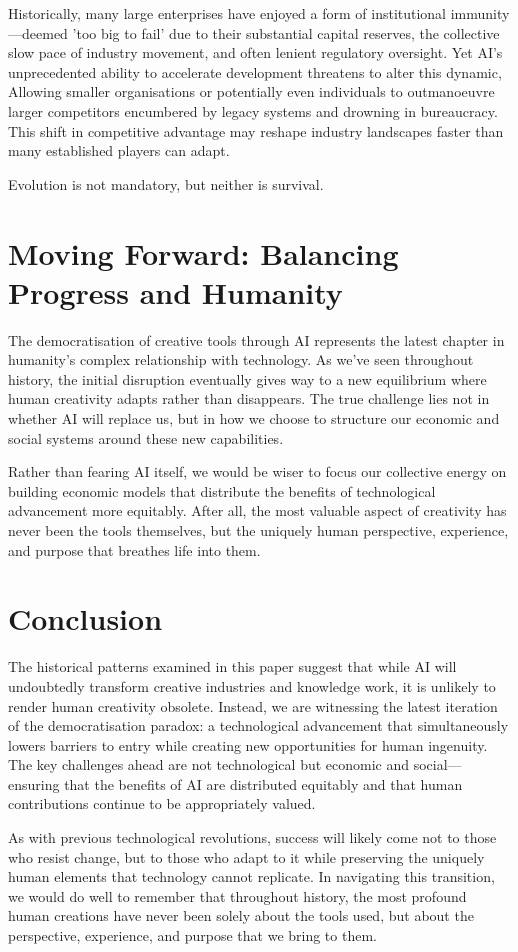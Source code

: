 \documentclass[12pt]{article}
\begin{document}
Historically, many large enterprises have enjoyed a form of institutional immunity—deemed 'too big to fail' due to their substantial capital reserves, the collective slow pace of industry movement, and often lenient regulatory oversight. Yet AI's unprecedented ability to accelerate development threatens to alter this dynamic, Allowing smaller organisations or potentially even individuals to outmanoeuvre larger competitors encumbered by legacy systems and drowning in bureaucracy. This shift in competitive advantage may reshape industry landscapes faster than many established players can adapt.

Evolution is not mandatory, but neither is survival.

\section{Moving Forward: Balancing Progress and Humanity}

The democratisation of creative tools through AI represents the latest chapter in humanity's complex relationship with technology. As we've seen throughout history, the initial disruption eventually gives way to a new equilibrium where human creativity adapts rather than disappears. The true challenge lies not in whether AI will replace us, but in how we choose to structure our economic and social systems around these new capabilities.

Rather than fearing AI itself, we would be wiser to focus our collective energy on building economic models that distribute the benefits of technological advancement more equitably. After all, the most valuable aspect of creativity has never been the tools themselves, but the uniquely human perspective, experience, and purpose that breathes life into them.

\section{Conclusion}

The historical patterns examined in this paper suggest that while AI will undoubtedly transform creative industries and knowledge work, it is unlikely to render human creativity obsolete. Instead, we are witnessing the latest iteration of the democratisation paradox: a technological advancement that simultaneously lowers barriers to entry while creating new opportunities for human ingenuity. The key challenges ahead are not technological but economic and social—ensuring that the benefits of AI are distributed equitably and that human contributions continue to be appropriately valued.

As with previous technological revolutions, success will likely come not to those who resist change, but to those who adapt to it while preserving the uniquely human elements that technology cannot replicate. In navigating this transition, we would do well to remember that throughout history, the most profound human creations have never been solely about the tools used, but about the perspective, experience, and purpose that we bring to them.


\end{document}

